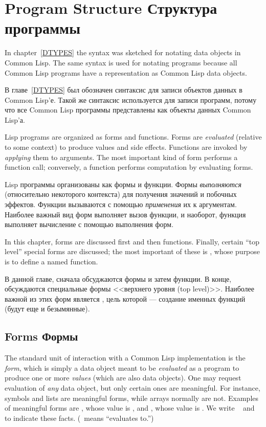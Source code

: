 
\clearpage\def\pagestatus{FINAL PROOF}


\chapter{Program Structure Структура программы}
\label{PROGS}

In chapter~\ref{DTYPES} the syntax was sketched for notating data objects
in Common Lisp.  The same syntax is used for notating programs because all
Common Lisp programs have a representation as Common Lisp data objects.

В главе~\ref{DTYPES} был обозначен синтаксис для записи объектов данных в Common
Lisp'е. Такой же синтаксис используется для записи программ, потому что все
Common Lisp программы представлены как объекты данных Common Lisp'а.

Lisp programs are organized as forms and functions.  Forms are
\textit{evaluated} (relative to some context) to produce values and side
effects.  Functions are invoked by \textit{applying} them to arguments.
The most important kind of form performs a function call;
conversely, a function performs computation by evaluating forms.

Lisp программы организованы как формы и функции. Формы \textit{выполняются}
(относительно некоторого контекста) для получения значений и побочных
эффектов. Функции вызываются с помощью \textit{применения} их к аргументам.
Наиболее важный вид форм выполняет вызов функции, и наоборот, функция выполняет
вычисление с помощью выполнения форм.

In this chapter, forms are discussed first and then functions.
Finally, certain ``top level'' special forms are discussed; the most
important of these is , whose purpose is to define a
named function.

В данной главе, сначала обсуджаются формы и затем функции. В конце, обсуждаются
специальные формы <<верхнего уровня (top level)>>. Наиболее важной из этих форм
является , цель которой --- создание именных функций (будут
еще и безымянные).

\section{Forms Формы}

The standard unit of interaction with a Common Lisp implementation is the \textit{form},
which is simply a data object meant to be \textit{evaluated} as a program
to produce one or more \textit{values} (which are also data objects).
One may request evaluation of \textit{any} data object, but only certain ones
are meaningful.  For instance,
symbols and lists are meaningful forms, while arrays
normally are not.  Examples of meaningful forms are ,
whose value is , and , whose value is .
We write  \EV\  and  \EV\ 
to indicate these facts.  (\EV\ means ``evaluates to.'')

